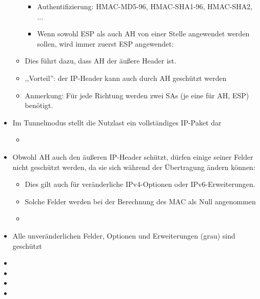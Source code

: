 \documentclass[a4paper]{article}
\begin{document}
\begin{multicols}{3}
\begin{itemize}
\begin{itemize}
                        \begin{itemize}
                            \item
                                  Authentifizierung: HMAC-MD5-96, HMAC-SHA1-96, HMAC-SHA2, ...
                            \item
                                  Wenn sowohl ESP als auch AH von einer Stelle angewendet werden
                                  sollen, wird immer zuerst ESP angewendet:
                        \end{itemize}
                  \item
                        Dies führt dazu, dass AH der äußere Header ist.
                  \item
                        ,,Vorteil'': der IP-Header kann auch durch AH geschützt werden
                  \item
                        Anmerkung: Für jede Richtung werden zwei SAs (je eine für AH, ESP)
                        benötigt.
              \end{itemize}
        \item
              Im Tunnelmodus stellt die Nutzlast ein vollständiges IP-Paket dar

              \begin{itemize}
                  \item
              \end{itemize}
        \item
              Obwohl AH auch den äußeren IP-Header schützt, dürfen einige seiner
              Felder nicht geschützt werden, da sie sich während der Übertragung
              ändern können:

              \begin{itemize}
                  \item
                        Dies gilt auch für veränderliche IPv4-Optionen oder
                        IPv6-Erweiterungen.
                  \item
                        Solche Felder werden bei der Berechnung des MAC als Null angenommen
                  \item
              \end{itemize}
        \item
              Alle unveränderlichen Felder, Optionen und Erweiterungen (grau) sind
              geschützt
        \item
        \item
        \item
        \item
    \end{itemize}



\end{multicols}
\end{document}
